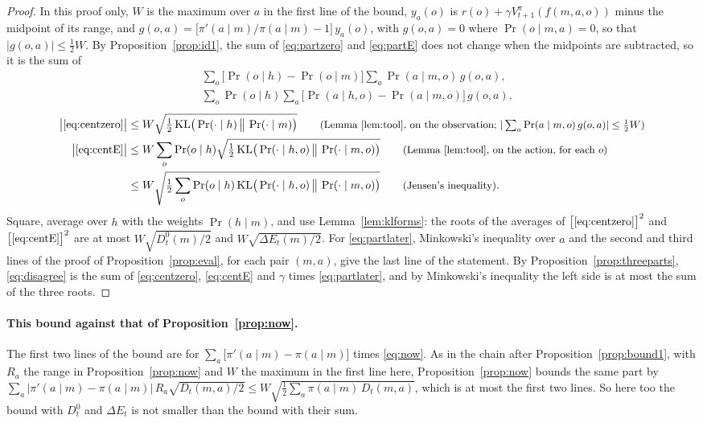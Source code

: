 \documentclass{article}
\theoremstyle{definition}
\newcommand{\KL}{\mathrm{KL}}
\newcommand{\dE}{\Delta E}
\newcommand{\why}[1]{\tag*{\small(#1)}}
\begin{document}
\begin{proof}
In this proof only, $W$ is the maximum over $a$ in the first line of the bound, $y_a(o)$ is $r(o)+\gamma V^\pi_{t+1}(f(m,a,o))$ minus the midpoint of its range, and $g(o,a)=\big[\pi'(a\mid m)/\pi(a\mid m)-1\big]\,y_a(o)$, with $g(o,a)=0$ where $\Pr(o\mid m,a)=0$, so that $|g(o,a)|\le\tfrac12W$. By Proposition~\ref{prop:id1}, the sum of \eqref{eq:partzero} and \eqref{eq:partE} does not change when the midpoints are subtracted, so it is the sum of
\begin{align}
&\sum_o\big[\Pr(o\mid h)-\Pr(o\mid m)\big]\sum_a\Pr(a\mid m,o)\,g(o,a), \label{eq:centzero}\\
&\sum_o\Pr(o\mid h)\sum_a\big[\Pr(a\mid h,o)-\Pr(a\mid m,o)\big]\,g(o,a). \label{eq:centE}
\end{align}
\begin{align*}
\big|\eqref{eq:centzero}\big|&\le W\sqrt{\tfrac12\,\KL\big(\Pr(\cdot\mid h)\,\big\|\,\Pr(\cdot\mid m)\big)} \why{Lemma~\ref{lem:tool}, on the observation; $|\sum_a\Pr(a\mid m,o)\,g(o,a)|\le\tfrac12W$}\\
\big|\eqref{eq:centE}\big|&\le W\sum_o\Pr(o\mid h)\sqrt{\tfrac12\,\KL\big(\Pr(\cdot\mid h,o)\,\big\|\,\Pr(\cdot\mid m,o)\big)} \why{Lemma~\ref{lem:tool}, on the action, for each $o$}\\
&\le W\sqrt{\tfrac12\sum_o\Pr(o\mid h)\,\KL\big(\Pr(\cdot\mid h,o)\,\big\|\,\Pr(\cdot\mid m,o)\big)} \why{Jensen's inequality}.
\end{align*}
Square, average over $h$ with the weights $\Pr(h\mid m)$, and use Lemma~\ref{lem:klforms}: the roots of the averages of $\big[\eqref{eq:centzero}\big]^2$ and $\big[\eqref{eq:centE}\big]^2$ are at most $W\sqrt{D^0_t(m)/2}$ and $W\sqrt{\dE_t(m)/2}$. For \eqref{eq:partlater}, Minkowski's inequality over $a$ and the second and third lines of the proof of Proposition~\ref{prop:eval}, for each pair $(m,a)$, give the last line of the statement. By Proposition~\ref{prop:threeparts}, \eqref{eq:disagree} is the sum of \eqref{eq:centzero}, \eqref{eq:centE} and $\gamma$ times \eqref{eq:partlater}, and by Minkowski's inequality the left side is at most the sum of the three roots.
\end{proof}

\paragraph{This bound against that of Proposition~\ref{prop:now}.} The first two lines of the bound are for $\sum_a\big[\pi'(a\mid m)-\pi(a\mid m)\big]$ times \eqref{eq:now}. As in the chain after Proposition~\ref{prop:bound1}, with $R_a$ the range in Proposition~\ref{prop:now} and $W$ the maximum in the first line here, Proposition~\ref{prop:now} bounds the same part by $\sum_a\big|\pi'(a\mid m)-\pi(a\mid m)\big|\,R_a\sqrt{D_t(m,a)/2}\le W\sqrt{\tfrac12\sum_a\pi(a\mid m)\,D_t(m,a)}$, which is at most the first two lines. So here too the bound with $D^0_t$ and $\dE_t$ is not smaller than the bound with their sum.
\end{document}
